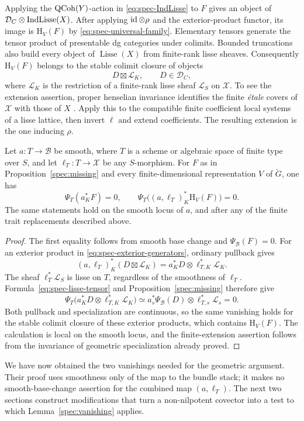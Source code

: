Applying the $\operatorname{QCoh}(Y)$-action in \eqref{eq:spec-IndLisse} to $F$ gives an
object of $\mathcal D_C\otimes\operatorname{IndLisse}(X)$.  After applying
$\operatorname{id}\otimes\rho$ and the exterior-product functor, its image is $\mathrm H_V(F)$
by \eqref{eq:spec-universal-family}.  Elementary tensors generate the tensor
product of presentable dg categories under colimits.  Bounded truncations
also build every object of $\operatorname{Lisse}(X)$ from finite-rank
lisse sheaves.  Consequently $\mathrm H_V(F)$ belongs to the stable colimit closure
of objects
\begin{equation}
 D\boxtimes\mathcal L_K,\qquad D\in\mathcal D_C,
 \label{eq:spec-exterior-generators}
\end{equation}
where $\mathcal L_K$ is the restriction of a finite-rank lisse sheaf
$\mathcal L_S$ on $\mathscr X$.
To see the extension assertion, proper henselian invariance identifies the
finite \emph{\'etale} covers of $\mathscr X$ with those of $X$
\cite[Tag~0A48]{Stacks}.  Apply this to the compatible finite coefficient
local systems of a lisse lattice, then invert $\ell$ and extend coefficients.
The resulting extension is the one inducing $\rho$.

\begin{lemma}
\label{spec:vanishing}
Let $a:T\to\mathcal B$ be smooth, where $T$ is a scheme or algebraic space
of finite type over $S$, and let $\ell_T:T\to\mathscr X$ be any $S$-morphism.
For $F$ as in Proposition~\ref{spec:missing} and every finite-dimensional
representation $V$ of $\check G$, one has
\[
 \Psi_T(a_K^*F)=0,
 \qquad
 \Psi_T\bigl((a,\ell_T)_K^*\mathrm H_V(F)\bigr)=0.
\]
The same statements hold on the smooth locus of $a$, and after any of the
finite trait replacements described above.
\end{lemma}

\begin{proof}
The first equality follows from smooth base change and
$\Psi_{\mathcal B}(F)=0$.
For an exterior product in \eqref{eq:spec-exterior-generators}, ordinary
pullback gives
\[
 (a,\ell_T)_K^*(D\boxtimes\mathcal L_K)
 =a_K^*D\otimes\ell_{T,K}^*\mathcal L_K.
\]
The sheaf $\ell_T^*\mathcal L_S$ is lisse on $T$, regardless of the
smoothness of $\ell_T$.  Formula~\eqref{eq:spec-lisse-tensor} and
Proposition~\ref{spec:missing} therefore give
\[
 \Psi_T\bigl(a_K^*D\otimes\ell_{T,K}^*\mathcal L_K\bigr)
 \simeq a_s^*\Psi_{\mathcal B}(D)\otimes\ell_{T,s}^*\mathcal L_s=0.
\]
Both pullback and specialization are continuous, so the same vanishing
holds for the stable colimit closure of these exterior products, which
contains $\mathrm H_V(F)$.  The calculation is local on the smooth locus, and the
finite-extension assertion follows from the invariance of geometric
specialization already proved.
\end{proof}

We have now obtained the two vanishings needed for the geometric argument.
Their proof uses smoothness only of the map to the bundle stack; it makes
no smooth-base-change assertion for the combined map $(a,\ell_T)$.
The next two sections construct modifications that turn a non-nilpotent
covector into a test to which Lemma~\ref{spec:vanishing} applies.
